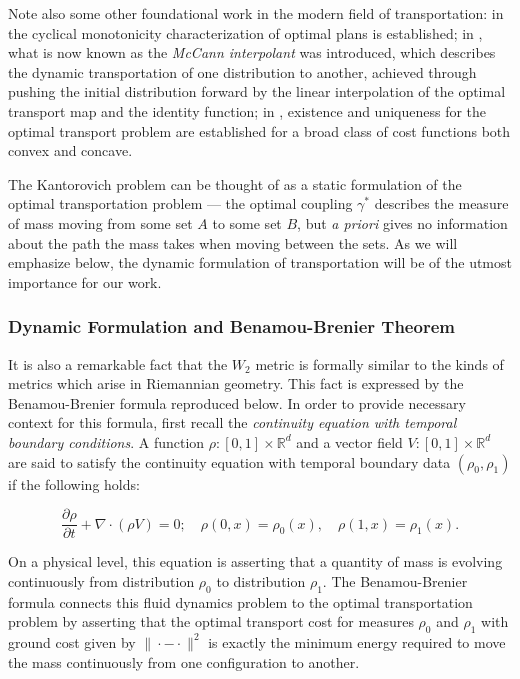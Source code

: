 \documentclass{article}
\newcommand{\R}{\mathbb{R}}
\begin{document}
Note also some other foundational work in the modern field of transportation: in \cite{smithNoteOptimalTransportation1987} the cyclical monotonicity characterization of optimal plans is established; in \cite{mccannConvexityPrincipleInteracting1997}, what is now known as the \emph{McCann interpolant} was introduced, which describes the dynamic transportation of one distribution to another, achieved through pushing the initial distribution forward by the linear interpolation of the optimal transport map and the identity function; in  \cite{gangboGeometryOptimalTransportation1996}, existence and uniqueness for the optimal transport problem are established for a broad class of cost functions both convex and concave.

The Kantorovich problem can be thought of as a static formulation of the optimal transportation problem --- the optimal coupling \(\gamma^*\) describes the measure of mass moving from some set \(A\) to some set \(B\), but \emph{a priori} gives no information about the path the mass takes when moving between the sets.  As we will emphasize below, the dynamic formulation of transportation will be of the utmost importance for our work.

\subsubsection{Dynamic Formulation and Benamou-Brenier Theorem}
It is also a remarkable fact that the \(W_2\) metric is formally similar to the kinds of metrics which arise in Riemannian geometry. This fact is expressed by the Benamou-Brenier formula reproduced below. In order to provide necessary context for this formula, first recall the \emph{continuity equation with temporal boundary conditions}. A function \(\rho:[0,1] \times \R^d\) and a vector field \(V:[0,1]\times\R^d\) are said to satisfy the continuity equation with temporal boundary data \((\rho_0, \rho_1)\) if the following holds:

\begin{equation}
  \label{CCE}
 \frac{\partial\rho}{\partial t} + \nabla\cdot(\rho V) = 0; \quad \rho(0, x) = \rho_0(x), \quad \rho(1,x) = \rho_1(x).
\end{equation}

On a physical level, this equation is asserting that a quantity of mass is evolving continuously from distribution \(\rho_0\) to distribution \(\rho_1\). The Benamou-Brenier formula connects this fluid dynamics problem to the optimal transportation problem by asserting that the optimal transport cost for measures \(\rho_0\) and \(\rho_1\) with ground cost given by \(\|\cdot - \cdot\|^2\) is exactly the minimum energy required to move the mass continuously from one configuration to another.
\end{document}
